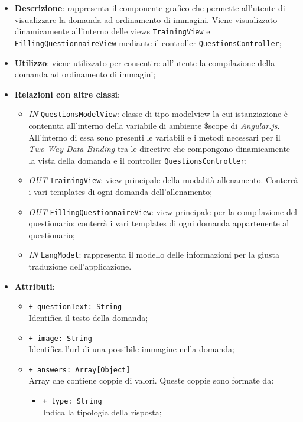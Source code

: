 		\begin{itemize}
			\item \textbf{Descrizione}: rappresenta il componente grafico che permette all'utente di visualizzare la domanda ad ordinamento di immagini. Viene visualizzato dinamicamente all'interno delle views \texttt{TrainingView} e \texttt{FillingQuestionnaireView} mediante il controller \texttt{QuestionsController};
			\item \textbf{Utilizzo}: viene utilizzato per consentire all'utente la compilazione della domanda ad ordinamento di immagini;
			\item \textbf{Relazioni con altre classi}: 
			\begin{itemize}
				\item \textit{IN} \texttt{QuestionsModelView}: classe di tipo modelview la cui istanziazione è contenuta all'interno della variabile di ambiente \$scope di \textit{Angular.js}. All'interno di essa sono presenti le variabili e i metodi necessari per il \textit{Two-Way Data-Binding} tra le directive che compongono dinamicamente la vista della domanda e il controller \texttt{QuestionsController};
				\item \textit{OUT} \texttt{TrainingView}: view principale della modalità allenamento. Conterrà i vari templates di ogni domanda dell'allenamento;
				\item \textit{OUT} \texttt{FillingQuestionnaireView}: view principale per la compilazione del questionario; conterrà i vari templates di ogni domanda appartenente al questionario;   
				\item \textit{IN} \texttt{LangModel}: rappresenta il modello delle informazioni per la giusta traduzione dell'applicazione.
			\end{itemize}
			\item \textbf{Attributi}: 
			\begin{itemize}
				\item \texttt{+ questionText: String} \\ Identifica il testo della domanda;
				\item \texttt{+ image: String} \\ Identifica l'url di una possibile immagine nella domanda;
				\item \texttt{+ answers: Array[Object]} \\ Array che contiene coppie di valori. Queste coppie sono formate da:
				\begin{itemize}
					\item \texttt{+ type: String} \\ Indica la tipologia della risposta;

\end{itemize}
\end{itemize}
\end{itemize}
